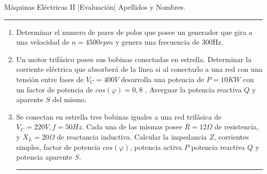 \documentclass[./eval.tex]{subfiles}
\newcommand{\head}{\noindent Máquinas Eléctricas II |Evaluación| Apellidos y Nombres.
\rule{10cm}{0.1mm}}
\newcommand{\separador}{\noindent\rule{\paperwidth}{0.1mm}\newline}
\begin{document}
\head

 \begin{enumerate}
 \item Determinar el numero de pares de polos que posee un generador que gira a una velocidad de $n=4500rpm$ y genera una frecuencia de 300Hz.
    \item Un motor trifásico posee sus bobinas conectadas en estrella. Determinar la corriente eléctrica que absorberá de la línea si al conectarlo a una red con una tensión entre fases de $V_C=400V$ desarrolla una potencia de $P=10KW$ con un factor de potencia de $cos(\varphi)=0,8$ , Averguar la potencia reactiva $Q$ y aparente $S$ del mismo.
    \item Se conectan en estrella tres bobinas iguales a una red trifásica de $V_C=220V, f=50Hz$. Cada una de las mismas posee $R=12\Omega$ de resistencia, y $X_L=20\Omega$ de reactancia inductiva. Calcular la impedancia $Z$, corrientes simples, factor de potencia $cos(\varphi)$, potencia activa $P$ potencia reactiva $Q$ y potencia aparente  $S$.
   
    \separador
\end{enumerate}
\end{document}
